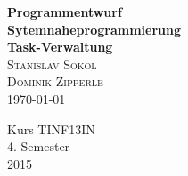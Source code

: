 
\begin{titlepage}
	
  \centering  
 	\rmfamily
 	
 	\vspace{4\baselineskip}
 	\normalsize \textbf{Programmentwurf}\\
 	\normalsize \textbf{Sytemnaheprogrammierung}
 	\vspace{2\baselineskip}\\
 	\huge \textbf{Task-Verwaltung}
 	\vspace{3\baselineskip}\\
 	\large \textsc{Stanislav Sokol\\Dominik Zipperle}
 	\vspace{1\baselineskip}\\
 	\large \today
  \vspace{5\baselineskip}\\
  \large
  	\begin{center}
  		Kurs TINF13IN\vspace{1\baselineskip}\\4. Semester\vspace{1\baselineskip}\\2015
  	\end{center}
    

\end{titlepage}
